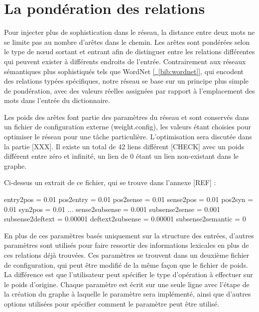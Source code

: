 \section{La pondération des relations}

Pour injecter plus de sophistication dans le réseau, la distance entre deux mots 
ne se limite pas au nombre d'arêtes dans le chemin. Les arêtes sont pondérées 
selon le type de nœud sortant et entrant afin de distinguer entre les relations 
différentes qui peuvent exister à différents endroits de l'entrée. Contrairement 
aux réseaux sémantiques plus sophistiqués tels que WordNet 
\hyperref[bib:wordnet]{[~\ref*{bib:wordnet}]}, qui encodent des relations typées 
spécifiques, notre réseau se base sur un principe plus simple de pondération, 
avec des valeurs réelles assignées par rapport à l'emplacement des mots dans 
l'entrée du dictionnaire.

Les poids des arêtes font partie des paramètres du réseau et sont conservés 
dans un fichier de configuration externe (weight.config), les valeurs étant 
choisies pour optimiser le réseau pour une tâche particulière. L'optimisation 
sera discutée dans la partie [XXX]. Il existe un total de 42 liens différent 
[CHECK] avec un poids différent entre zéro et infinité, un lien de 0 étant un 
lien non-existant dans le graphe.

Ci-dessus un extrait de ce fichier, qui se trouve dans l'annexe [REF] :

\begin{framed}
entry2pos = 0.01\newline
pos2entry = 0.01\newline
pos2sense = 0.01\newline
sense2pos = 0.01\newline
pos2syn = 0.01\newline
syn2pos = 0.01\newline
...\newline
sense2subsense = 0.001\newline
subsense2sense = 0.001\newline
subsense2deftext = 0.00001\newline
deftext2subsense = 0.00001\newline
subsense2semantic = 0\newline
\end{framed}

En plus de ces paramètres basés uniquement sur la structure des entrées, 
d'autres paramètres sont utilisés pour faire ressortir des informations 
lexicales en plus de ces relations déjà trouvées. Ces paramètres se trouvent 
dans un deuxième fichier de configuration, qui peut être modifié de la même 
façon que le fichier de poids. La différence est que l'utilisateur peut 
spécifier le type d'opération à effectuer sur le poids d'origine. Chaque 
paramètre est écrit sur une seule ligne avec l'étape de la création du graphe à 
laquelle le paramètre sera implémenté, ainsi que d'autres options utilisées pour 
spécifier comment le paramètre peut être utilisé.


